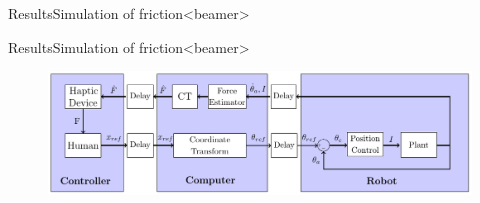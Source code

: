 \begin{frame}{Results}{Simulation of friction}<beamer>
\begin{figure}
\centering

\end{figure}
\end{frame}


\begin{frame}{Results}{Simulation of friction}<beamer>

\begin{figure}
	\centering
	\includegraphics[scale=0.7]{Billeder/simple_control}
\end{figure}
\end{frame}